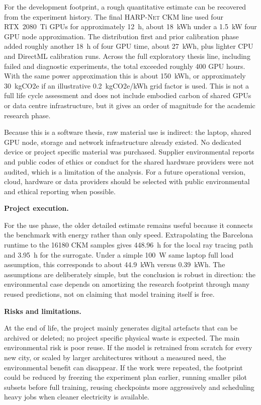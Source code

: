 For the development footprint, a rough quantitative estimate can be recovered
from the experiment history. The final \textsc{HARP-Net CKM} line used four
RTX~2080~Ti GPUs for approximately \SI{12}{h}, about \SI{18}{kWh} under a
\SI{1.5}{kW} four GPU node approximation. The distribution first and prior
calibration phase added roughly another \SI{18}{h} of four GPU time, about
\SI{27}{kWh}, plus lighter CPU and DirectML calibration runs. Across the full
exploratory thesis line, including failed and diagnostic experiments, the total
exceeded roughly \num{400} GPU hours. With the same power approximation this is
about \SI{150}{kWh}, or approximately \SI{30}{kgCO2e} if an illustrative
\SI{0.2}{kgCO2e/kWh} grid factor is used. This is not a full life cycle
assessment and does not include embodied carbon of shared GPUs or data centre
infrastructure, but it gives an order of magnitude for the academic research
phase.

Because this is a software thesis, raw material use is indirect: the laptop,
shared GPU node, storage and network infrastructure already existed. No dedicated
device or project specific material was purchased. Supplier environmental reports
and public codes of ethics or conduct for the shared hardware providers were not
audited, which is a limitation of the analysis. For a future operational version,
cloud, hardware or data providers should be selected with public environmental
and ethical reporting when possible.

\textbf{Project execution.}

For the use phase, the older detailed estimate remains useful because it
connects the benchmark with energy rather than only speed. Extrapolating the
Barcelona runtime to the \num{16180} CKM samples gives \SI{448.96}{h} for the
local ray tracing path and \SI{3.95}{h} for the surrogate. Under a simple
\SI{100}{W} same laptop full load assumption, this corresponds to about
\SI{44.9}{kWh} versus \SI{0.39}{kWh}. The assumptions are deliberately simple,
but the conclusion is robust in direction: the environmental case depends on
amortizing the research footprint through many reused predictions, not on
claiming that model training itself is free.

\textbf{Risks and limitations.}

At the end of life, the project mainly generates digital artefacts that can be
archived or deleted; no project specific physical waste is expected. The main
environmental risk is poor reuse. If the model is retrained from scratch for
every new city, or scaled by larger architectures without a measured need, the
environmental benefit can disappear. If the work were repeated, the footprint
could be reduced by freezing the experiment plan earlier, running smaller pilot
subsets before full training, reusing checkpoints more aggressively and
scheduling heavy jobs when cleaner electricity is available.

